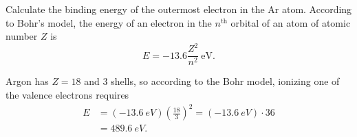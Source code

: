 \documentclass[addpoints]{physlabs} %
\begin{document}
\begin{prelab}
    \filbreak
    \question[1] Calculate the binding energy of the outermost electron in the Ar atom. According to Bohr's model, the energy of an electron in the $n^\text{th}$ orbital of an atom of atomic number $Z$ is 
    \[
        E = -13.6\frac{Z^2}{n^2}~\text{eV}.
    \]
    \begin{solution}[3cm]
        Argon has $Z=18$ and 3 shells, so according to the Bohr model, ionizing one of the valence electrons requires
        \begin{align*}
            E &= (-\qty{13.6}{eV})\left(\frac{18}{3}\right)^2
               = (-\qty{13.6}{eV})\cdot 36
            \\
              &= \qty{489.6}{eV}.
        \end{align*}
    \end{solution}
    
\end{prelab}
\end{document}
